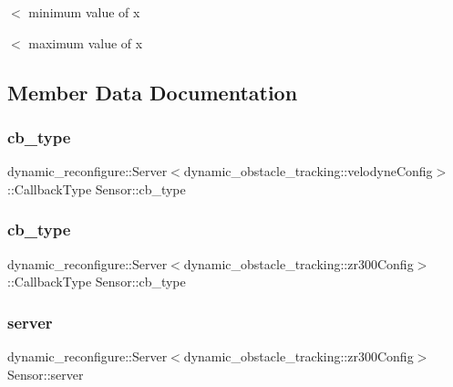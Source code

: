 $<$ minimum value of x

$<$ maximum value of x 

\subsection{Member Data Documentation}
\mbox{\label{classSensor_af6f13b558862028f47a169529610041d}} 
\subsubsection{\texorpdfstring{cb\+\_\+type}{cb\_type}\hspace{0.1cm}{\footnotesize\ttfamily [1/2]}}
{\footnotesize\ttfamily dynamic\+\_\+reconfigure\+::\+Server$<$dynamic\+\_\+obstacle\+\_\+tracking\+::velodyne\+Config$>$\+::Callback\+Type Sensor\+::cb\+\_\+type\hspace{0.3cm}{\ttfamily [protected]}}

\mbox{\label{classSensor_afcb79b7b510c2638a22638153094a2b4}} 
\subsubsection{\texorpdfstring{cb\+\_\+type}{cb\_type}\hspace{0.1cm}{\footnotesize\ttfamily [2/2]}}
{\footnotesize\ttfamily dynamic\+\_\+reconfigure\+::\+Server$<$dynamic\+\_\+obstacle\+\_\+tracking\+::zr300\+Config$>$\+::Callback\+Type Sensor\+::cb\+\_\+type\hspace{0.3cm}{\ttfamily [protected]}}

\mbox{\label{classSensor_ad27e54baddc7c972d5396c9c2f855321}} 
\subsubsection{\texorpdfstring{server}{server}\hspace{0.1cm}{\footnotesize\ttfamily [1/2]}}
{\footnotesize\ttfamily dynamic\+\_\+reconfigure\+::\+Server$<$dynamic\+\_\+obstacle\+\_\+tracking\+::zr300\+Config$>$ Sensor\+::server\hspace{0.3cm}{\ttfamily [protected]}}

